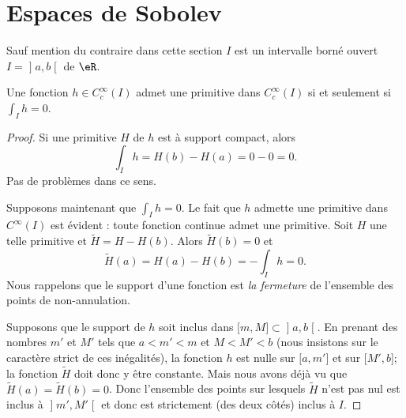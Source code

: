 \section{Espaces de Sobolev}

Sauf mention du contraire dans cette section \( I\) est un intervalle borné ouvert \( I=\mathopen] a , b \mathclose[\) de \( \eR\).

\begin{proposition} \label{PropHFWNpRb}
    Une fonction \( h\in C^{\infty}_c(I)\) admet une primitive dans \(  C^{\infty}_c(I)\) si et seulement si \( \int_Ih=0\).
\end{proposition}

\begin{proof}
    Si une primitive \( H\) de \( h\) est à support compact, alors
    \begin{equation}
        \int_Ih=H(b)-H(a)=0-0=0.
    \end{equation}
    Pas de problèmes dans ce sens.

    Supposons maintenant que \( \int_Ih=0\). Le fait que \( h\) admette une primitive dans \(  C^{\infty}(I)\) est évident : toute fonction continue admet une primitive. Soit \( H\) une telle primitive et \( \tilde H=H-H(b)\). Alors \( \tilde H(b)=0\) et 
    \begin{equation}
        \tilde H(a)=H(a)-H(b)=-\int_Ih=0.
    \end{equation}
    Nous rappelons que le support d'une fonction est \emph{la fermeture} de l'ensemble des points de non-annulation.

    Supposons que le support de \( h\) soit inclus dans \( \mathopen[ m , M \mathclose]\subset\mathopen] a , b \mathclose[\). En prenant des nombres \( m'\) et \( M'\) tels que \( a<m'<m\) et \( M<M'<b\) (nous insistons sur le caractère strict de ces inégalités), la fonction \( h\) est nulle sur \( \mathopen[ a , m' \mathclose]\) et sur \( \mathopen[ M' , b \mathclose]\); la fonction \( \tilde H\) doit donc y être constante. Mais nous avons déjà vu que \( \tilde H(a)=\tilde H(b)=0\). Donc l'ensemble des points sur lesquels \( \tilde H\) n'est pas nul est inclus à \( \mathopen] m' , M' \mathclose[\) et donc est strictement (des deux côtés) inclus à \( I\).
\end{proof}


